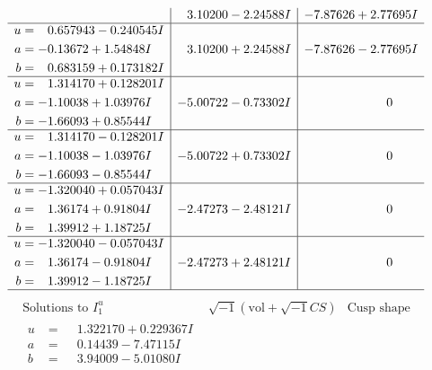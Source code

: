 \documentclass[1p]{elsarticle_modified}
\theoremstyle{definition}
\newcommand{\I}{\sqrt{-1}}
\begin{document}
$$\begin{array}{c|c|c}
 & \phantom{-}3.10200 - 2.24588 I & -7.87626 + 2.77695 I \\ \hline\begin{aligned}
u &= \phantom{-}0.657943 - 0.240545 I \\
a &= -0.13672 + 1.54848 I \\
b &= \phantom{-}0.683159 + 0.173182 I\end{aligned}
 & \phantom{-}3.10200 + 2.24588 I & -7.87626 - 2.77695 I \\ \hline\begin{aligned}
u &= \phantom{-}1.314170 + 0.128201 I \\
a &= -1.10038 + 1.03976 I \\
b &= -1.66093 + 0.85544 I\end{aligned}
 & -5.00722 - 0.73302 I & \phantom{-0.000000 } 0 \\ \hline\begin{aligned}
u &= \phantom{-}1.314170 - 0.128201 I \\
a &= -1.10038 - 1.03976 I \\
b &= -1.66093 - 0.85544 I\end{aligned}
 & -5.00722 + 0.73302 I & \phantom{-0.000000 } 0 \\ \hline\begin{aligned}
u &= -1.320040 + 0.057043 I \\
a &= \phantom{-}1.36174 + 0.91804 I \\
b &= \phantom{-}1.39912 + 1.18725 I\end{aligned}
 & -2.47273 - 2.48121 I & \phantom{-0.000000 } 0 \\ \hline\begin{aligned}
u &= -1.320040 - 0.057043 I \\
a &= \phantom{-}1.36174 - 0.91804 I \\
b &= \phantom{-}1.39912 - 1.18725 I\end{aligned}
 & -2.47273 + 2.48121 I & \phantom{-0.000000 } 0\\
 \hline 
 \end{array}$$\newpage$$\begin{array}{c|c|c}  
\text{Solutions to }I^u_{1}& \I (\text{vol} + \sqrt{-1}CS) & \text{Cusp shape}\\
 \hline 
\begin{aligned}
u &= \phantom{-}1.322170 + 0.229367 I \\
a &= \phantom{-}0.14439 - 7.47115 I \\
b &= \phantom{-}3.94009 - 5.01080 I\end{aligned}

\end{array}$$
\end{document}
